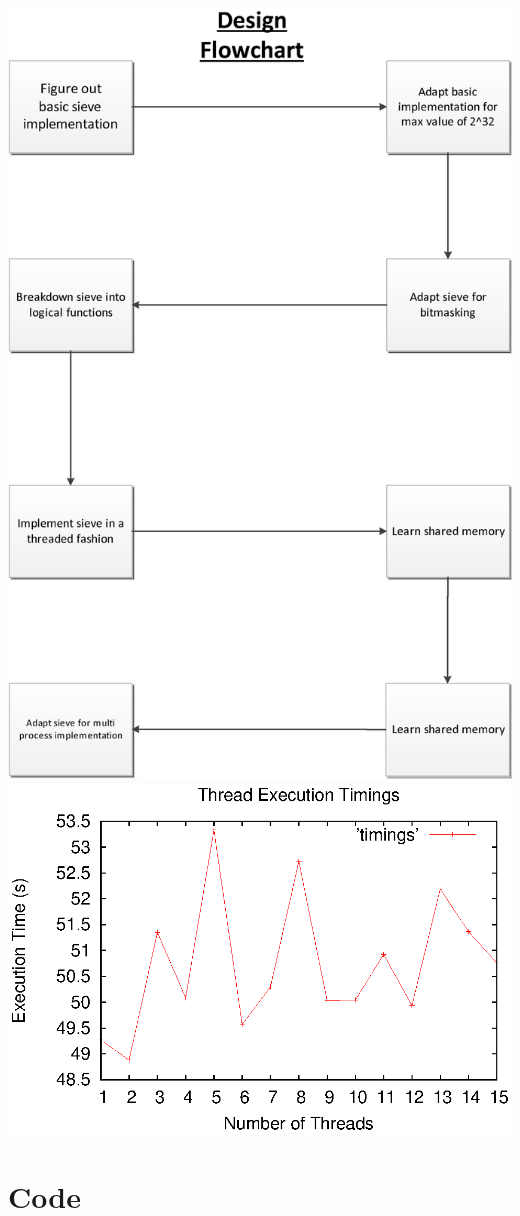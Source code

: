\documentclass[letterpaper,10pt,titlepage]{article}
\begin{document}
\includegraphics[height=\textheight]{DesignFlowchart.eps}
\includegraphics[height=\textheight]{timings.eps}


\section{Code}
\label{myar Source Code}

\end{document}
